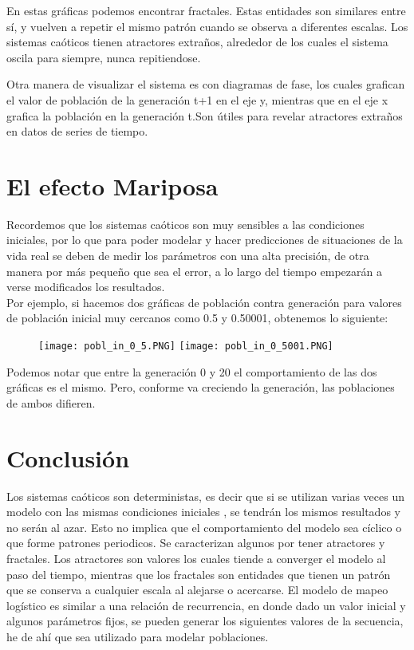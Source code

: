 \documentclass[a4paper]{article}
\begin{document}
En estas gráficas podemos encontrar fractales. Estas entidades son similares entre sí, y  vuelven a repetir el mismo patrón cuando se observa a diferentes escalas. Los sistemas caóticos tienen atractores extraños, alrededor de los cuales el sistema oscila para siempre, nunca repitiendose.

Otra manera de visualizar el sistema es con diagramas de fase, los cuales grafican el valor de población de la generación t+1 en el eje y, mientras que en el eje x grafica la población en la generación t.Son útiles para revelar atractores extraños en datos de series de tiempo. 


\section{El efecto Mariposa}

Recordemos que los sistemas caóticos son muy sensibles a las condiciones iniciales, por lo que para poder modelar y hacer predicciones de situaciones de la vida real se deben de medir los parámetros con una alta precisión, de otra manera por más pequeño que sea el error, a lo largo del tiempo empezarán a verse modificados los resultados. \\
Por ejemplo, si hacemos dos gráficas de población contra generación para valores de población inicial muy cercanos como 0.5 y 0.50001, obtenemos lo siguiente:



\begin{figure}[ht!]
\centering
\texttt{[image: pobl\_in\_0\_5.PNG]}
\texttt{[image: pobl\_in\_0\_5001.PNG]}

\end{figure}

Podemos notar que entre la generación 0 y 20 el comportamiento de las dos gráficas es el mismo. Pero, conforme va creciendo la generación, las poblaciones de ambos difieren. 

\newpage

\section{Conclusión}
Los sistemas caóticos son deterministas, es decir que si se utilizan varias veces un modelo con las mismas condiciones iniciales , se tendrán los mismos resultados y no serán al azar. Esto no implica que el comportamiento del modelo sea cíclico o que forme patrones periodicos. Se caracterizan algunos por tener atractores y fractales. Los atractores son valores los cuales tiende a converger el modelo al paso del tiempo, mientras que los fractales son entidades que tienen un patrón que se conserva a cualquier escala al alejarse o acercarse. El modelo de mapeo logístico es similar a una relación de recurrencia, en donde dado un valor inicial y algunos parámetros fijos, se pueden generar los siguientes valores de la secuencia, he de ahí que sea utilizado para modelar poblaciones.
\end{document}
